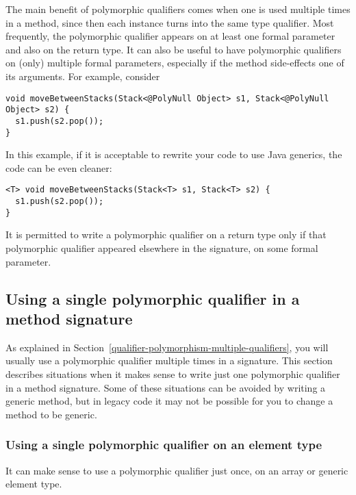 The main benefit of polymorphic qualifiers comes when one is used multiple times
in a method, since then each instance turns into the same type qualifier.
Most frequently, the polymorphic qualifier appears on at least one formal
parameter and also on the return type.  It can also be useful to have
polymorphic qualifiers on (only) multiple formal parameters, especially if
the method side-effects one of its arguments.
For example, consider

\begin{Verbatim}
void moveBetweenStacks(Stack<@PolyNull Object> s1, Stack<@PolyNull Object> s2) {
  s1.push(s2.pop());
}
\end{Verbatim}

\noindent
In this example, if it is acceptable to rewrite your code to use Java
generics, the code can be even cleaner:

\begin{Verbatim}
<T> void moveBetweenStacks(Stack<T> s1, Stack<T> s2) {
  s1.push(s2.pop());
}
\end{Verbatim}

\label{qualifier-polymorphism-return-type}
It is permitted to write a polymorphic qualifier on a return type only if
that polymorphic qualifier appeared elsewhere in the signature, on some
formal parameter.



\subsection{Using a single polymorphic qualifier in a method signature\label{qualifier-polymorphism-single-qualifier}}

As explained in Section~\ref{qualifier-polymorphism-multiple-qualifiers},
you will usually use a polymorphic qualifier
multiple times in a signature.
This section describes situations when it makes sense to write just one
polymorphic qualifier in a method signature.
Some of these situations can be avoided by writing a generic method,
but in legacy code it may not be possible for you to change a method to be
generic.


\subsubsection{Using a single polymorphic qualifier on an element type\label{qualifier-polymorphism-element-types}}

It can make sense to use a polymorphic qualifier just once, on an array or
generic element type.


